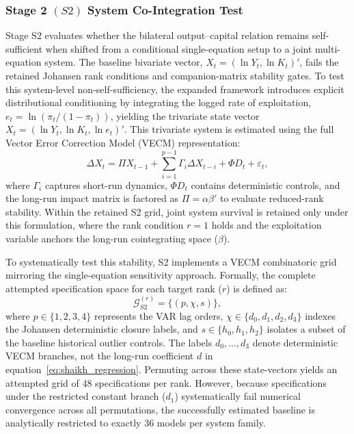 \documentclass[11pt]{article}
\begin{document}
\subsubsection{Stage 2 \texorpdfstring{$(S2)$}: System Co-Integration Test}
\label{subsec:S2_system}

Stage S2 evaluates whether the bilateral output--capital relation remains self-sufficient when shifted from a conditional single-equation setup to a joint multi-equation system. The baseline bivariate vector, $X_t = (\ln Y_t, \ln K_t)'$, fails the retained Johansen rank conditions and companion-matrix stability gates. To test this system-level non-self-sufficiency, the expanded framework introduces explicit distributional conditioning by integrating the logged rate of exploitation, $e_t = \ln(\pi_t / (1 - \pi_t))$, yielding the trivariate state vector $X_t = (\ln Y_t, \ln K_t, \ln e_t)'$. This trivariate system is estimated using the full \citet{Johansen1991} Vector Error Correction Model (VECM) representation:
\begin{equation}
\label{eq:vecm_johansen}
\Delta X_t = \Pi X_{t-1} + \sum_{i=1}^{p-1} \Gamma_i \Delta X_{t-i} + \Phi D_t + \varepsilon_t,
\end{equation}
where $\Gamma_i$ captures short-run dynamics, $\Phi D_t$ contains deterministic controls, and the long-run impact matrix is factored as $\Pi = \alpha \beta'$ to evaluate reduced-rank stability. Within the retained S2 grid, joint system survival is retained only under this formulation, where the rank condition $r=1$ holds and the exploitation variable anchors the long-run cointegrating space ($\beta$).

To systematically test this stability, S2 implements a VECM combinatoric grid mirroring the single-equation sensitivity approach. Formally, the complete attempted specification space for each target rank ($r$) is defined as:
\begin{equation}
\mathcal{G}_{S2}^{(r)} = \{(p, \chi, s)\},
\label{eq:G_S2}
\end{equation}
where $p \in \{1, 2, 3, 4\}$ represents the VAR lag orders, $\chi \in \{d_0, d_1, d_2, d_3\}$ indexes the Johansen deterministic closure labels, and $s \in \{h_0, h_1, h_2\}$ isolates a subset of the baseline historical outlier controls. The labels $d_0,\ldots,d_3$ denote deterministic VECM branches, not the long-run coefficient $d$ in equation~\eqref{eq:shaikh_regression}. Permuting across these state-vectors yields an attempted grid of 48 specifications per rank. However, because specifications under the restricted constant branch ($d_1$) systematically fail numerical convergence across all permutations, the successfully estimated baseline is analytically restricted to exactly 36 models per system family.
\end{document}
